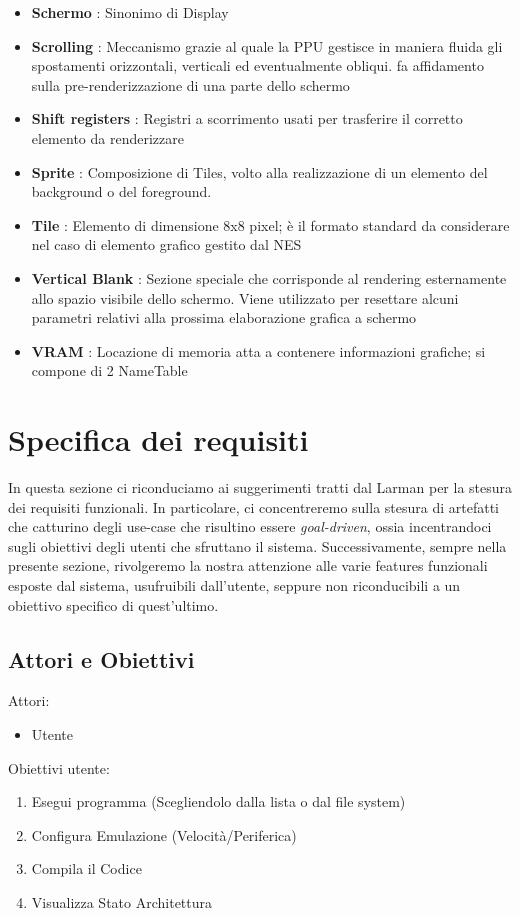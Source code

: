 \documentclass[11pt]{article}
\begin{document}
\begin{itemize}
{}
\item{
	\textbf{Schermo }: Sinonimo di Display
}
\item{
	\textbf{Scrolling }: Meccanismo grazie al quale la PPU gestisce in maniera fluida gli spostamenti orizzontali, verticali ed eventualmente obliqui. fa affidamento sulla pre-renderizzazione di una parte dello schermo
}
\item{
	\textbf{Shift registers }: Registri a scorrimento usati per trasferire il corretto elemento da renderizzare
}
\item{
	\textbf{Sprite }: Composizione di Tiles, volto alla realizzazione di un elemento del background o del foreground.
}
\item{
	\textbf{Tile }: Elemento di dimensione 8x8 pixel; è il formato standard da considerare nel caso di elemento grafico gestito dal NES
}
\item{
	\textbf{Vertical Blank }: Sezione speciale che corrisponde al rendering esternamente allo spazio visibile dello schermo. Viene utilizzato per resettare alcuni parametri relativi alla prossima elaborazione grafica a schermo
}
\item{
	\textbf{VRAM }: Locazione di memoria atta a contenere informazioni grafiche; si compone di 2 NameTable
}


\end{itemize}

\clearpage

\section{Specifica dei requisiti}
In questa sezione ci riconduciamo ai suggerimenti tratti dal Larman per la stesura dei requisiti funzionali. In particolare, ci concentreremo sulla stesura di artefatti che catturino degli use-case che risultino essere \emph{goal-driven}, ossia incentrandoci sugli obiettivi degli utenti che sfruttano il sistema. Successivamente, sempre nella presente sezione, rivolgeremo la nostra attenzione alle varie features funzionali esposte dal sistema, usufruibili dall'utente, seppure non riconducibili a un obiettivo specifico di quest'ultimo.

\subsection{Attori e Obiettivi}
Attori:
\begin{itemize}
	\item{Utente}
\end{itemize}
Obiettivi utente:
\begin{enumerate}
	\item{
		Esegui programma (Scegliendolo dalla lista o dal file system)
	}
	\item{
		Configura Emulazione (Velocità/Periferica)
	}
	\item{
		Compila il Codice 
	}
	\item{
		Visualizza Stato Architettura 
	}
\end{enumerate}
\end{document}
